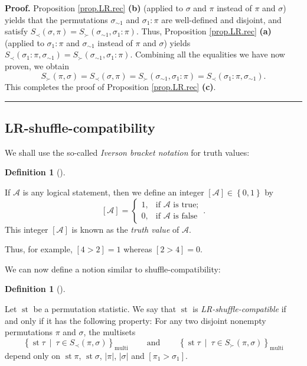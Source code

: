 \documentclass[numbers=enddot,12pt,final,onecolumn,notitlepage]{scrartcl}%
\theoremstyle{definition}
\newtheorem{defi}[theo]{Definition}
\newenvironment{definition}[1][]
{\begin{defi}[#1]\begin{leftbar}}
{\end{leftbar}\end{defi}}
\newenvironment{proof}[1][Proof]{\noindent\textbf{#1.} }{\ \rule{0.5em}{0.5em}}
\newenvironment{verlong}{}{}
\begin{document}
\begin{verlong}
\begin{proof}
Proposition \ref{prop.LR.rec} \textbf{(b)} (applied to $\sigma$ and $\pi$
instead of $\pi$ and $\sigma$) yields that the permutations $\sigma_{\sim1}$
and $\sigma_{1}:\pi$ are well-defined and disjoint, and satisfy $S_{\prec
}\left(  \sigma,\pi\right)  =S_{\succ}\left(  \sigma_{\sim1},\sigma_{1}%
:\pi\right)  $. Thus, Proposition \ref{prop.LR.rec} \textbf{(a)} (applied to
$\sigma_{1}:\pi$ and $\sigma_{\sim1}$ instead of $\pi$ and $\sigma$) yields
$S_{\prec}\left(  \sigma_{1}:\pi,\sigma_{\sim1}\right)  =S_{\succ}\left(
\sigma_{\sim1},\sigma_{1}:\pi\right)  $. Combining all the equalities we have
now proven, we obtain%
\[
S_{\succ}\left(  \pi,\sigma\right)  =S_{\prec}\left(  \sigma,\pi\right)
=S_{\succ}\left(  \sigma_{\sim1},\sigma_{1}:\pi\right)  =S_{\prec}\left(
\sigma_{1}:\pi,\sigma_{\sim1}\right)  .
\]
This completes the proof of Proposition \ref{prop.LR.rec} \textbf{(c)}.
\end{proof}
\end{verlong}

\subsection{LR-shuffle-compatibility}

We shall use the so-called \textit{Iverson bracket notation} for truth values:

\begin{definition}
\label{def.iverson}If $\mathcal{A}$ is any logical statement, then we define
an integer $\left[  \mathcal{A}\right]  \in\left\{  0,1\right\}  $ by%
\[
\left[  \mathcal{A}\right]  =%
\begin{cases}
1, & \text{if }\mathcal{A}\text{ is true};\\
0, & \text{if }\mathcal{A}\text{ is false}%
\end{cases}
.
\]
This integer $\left[  \mathcal{A}\right]  $ is known as the \textit{truth
value} of $\mathcal{A}$.
\end{definition}

Thus, for example, $\left[  4>2\right]  =1$ whereas $\left[  2>4\right]  =0$.

We can now define a notion similar to shuffle-compatibility:

\begin{definition}
\label{def.LRcomp}Let $\operatorname{st}$ be a permutation statistic. We say
that $\operatorname{st}$ is \textit{LR-shuffle-compatible} if and only if it
has the following property: For any two disjoint nonempty permutations $\pi$
and $\sigma$, the multisets%
\[
\left\{  \operatorname{st} \tau   \ \mid\ \tau\in S_{\prec
}\left(  \pi,\sigma\right)  \right\}  _{\operatorname*{multi}}
\ \ \ \ \ \ \ \ \ \ \text{and}\ \ \ \ \ \ \ \ \ \ \left\{  \operatorname{st}
\tau \ \mid\ \tau\in S_{\succ}\left(  \pi,\sigma\right)
\right\}  _{\operatorname*{multi}}
\]
depend only on $\operatorname{st} \pi   $, $\operatorname{st} \sigma$,
$\left\vert \pi\right\vert $, $\left\vert
\sigma\right\vert $ and $\left[  \pi_{1}>\sigma_{1}\right]  $.
\end{definition}
\end{document}
